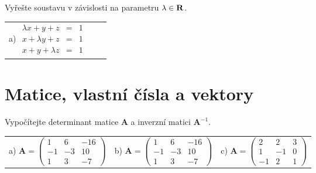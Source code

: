 \documentclass[a4paper,10pt]{book}
\def\Real{{\rm\bf R}}
\begin{document}
\exercise \label{ex:slr2} Vyřešte soustavu v závislosti na parametru $\lambda\in\Real$.
\begin{center}
\begin{tabular}{ccc}
a)  $\begin{array}{rcl}
    \lambda x + y + z & = & 1 \\
    x + \lambda y + z & = & 1 \\
    x + y + \lambda z & = & 1 
  \end{array} $ %
\end{tabular}
\end{center}

\section{Matice, vlastní čísla a vektory}
\exercise \label{ex:mvlc1} Vypočítejte determinant matice $\mathbf{A}$ a inverzní matici $\mathbf{A}^{-1}$.

\begin{center}
\begin{tabular}{ccc}
a)  $ \mathbf{A}=
          \begin{pmatrix}
            1 & 6 & -16 \\
            -1 & -3 & 10 \\
            1 & 3 & -7
          \end{pmatrix}
  $ &
b)  $ \mathbf{A}=
          \begin{pmatrix}
            1 & 6 & -16 \\
            -1 & -3 & 10 \\
            1 & 3 & -7
          \end{pmatrix}
  $ &  
c)  $ \mathbf{A}=
          \begin{pmatrix}
            2 & 2 & 3 \\
            1 & -1 & 0 \\
            -1 & 2 & 1
          \end{pmatrix}
  $
\end{tabular}
\end{center}
\end{document}
